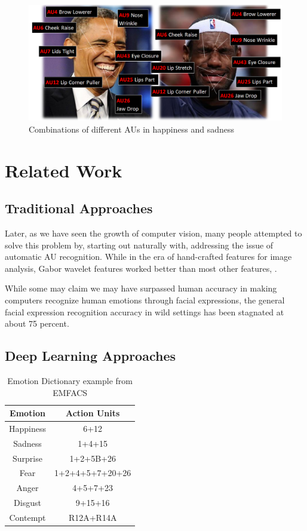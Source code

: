 \begin{figure}
  \includegraphics[width=\linewidth]{AUs.png}
  \caption{Combinations of different AUs in happiness and sadness\cite{fig2}}
  \label{fig:emotions2}
\end{figure}


\section{Related Work}


\subsection{Traditional Approaches}


Later, as we have seen the growth of computer vision, many people attempted to solve this problem by, starting out naturally with, addressing the issue of automatic AU recognition\cite{survey3}. While in the era of hand-crafted features for image analysis, Gabor wavelet features worked better than most other features\cite{autofacs1}, \cite{autofacs2}.


While some may claim we may have surpassed human accuracy\cite{SArt} in making computers recognize human emotions through facial expressions, the general facial expression recognition accuracy in wild settings has been stagnated at about 75 percent.

\subsection{Deep Learning Approaches}

\begin{table}
\begin{center}
\begin{tabular}{|cc|}
\hline
\textbf{Emotion} & \textbf{Action Units} \\
\hline
Happiness &	6+12 \\
Sadness &	1+4+15 \\
Surprise &	1+2+5B+26 \\
Fear &	1+2+4+5+7+20+26 \\
Anger &	4+5+7+23 \\
Disgust &	9+15+16 \\
Contempt &	R12A+R14A \\
\hline
\end{tabular}
\end{center}
\caption{Emotion Dictionary example from EMFACS\cite{emfacsWiki}}
\label{table:emotions1}
\end{table}


